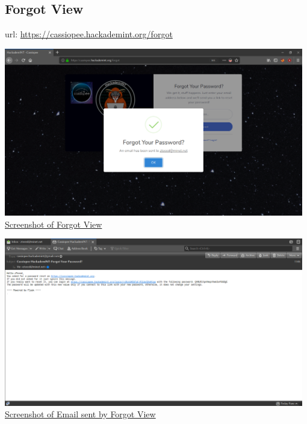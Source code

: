 \subsection{Forgot View}
url: \url{https://cassiopee.hackademint.org/forgot}
\\
\begin{center}
\includegraphics[width=0.98\textwidth]{images/flask-application-02.png}
\\
\underline{Screenshot of Forgot View}
\end{center}

\pagebreak

\begin{center}
\includegraphics[width=0.98\textwidth]{images/flask-application-021.png}
\\
\underline{Screenshot of Email sent by Forgot View}
\end{center}


